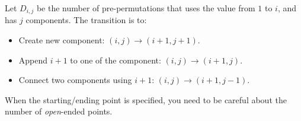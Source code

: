 Let $D_{i,j}$ be the number of pre-permutations that uses the value from $1$ to $i$, and has $j$ components.
The transition is to:
\begin{itemize}
	\item Create new component: $(i, j) \to (i+1, j+1)$.
	\item Append $i+1$ to one of the component: $(i, j) \to (i+1, j)$.
	\item Connect two components using $i+1$: $(i, j) \to (i+1, j-1)$.
\end{itemize}

When the starting/ending point is specified, you need to be careful about the number of \textit{open}-ended points.